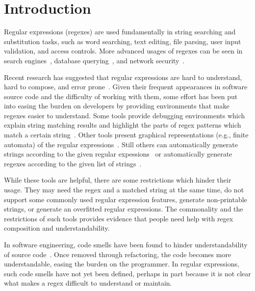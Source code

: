\section{Introduction }

Regular expressions (regexes) are used fundamentally in string searching and substitution tasks, such as word searching, text editing, file parsing, user input validation, and access controls. More advanced usages of regexes can be seen in search engines~\cite{zhao2005fully}, database querying~\cite{Yeole:2011:ADT:1980022.1980229}, and network security~\cite{network,hutchings2002assisting,ficara2008improved}.

Recent research has suggested that regular expressions are hard to understand, hard to compose, and error prone~\cite{Spishak:2012:TSR:2318202.2318207}. Given their frequent appearances in software source code and the difficulty of working with them, some effort has been put into easing the burden on developers by providing environments that make regexes easier to understand. Some tools provide debugging environments which explain string matching results and highlight the parts of regex patterns which match a certain string~\cite{regex101,regexr}. Other tools present graphical representations (e.g., finite automata) of the regular expressions~\cite{regexper,rise4fun}. Still others can automatically generate strings according to the given regular expessions~\cite{hampi,rex} or automatically generate regexes according to the given list of strings~\cite{Babbar:2010:CBA:1871840.1871848, Li:2008:REL:1613715.1613719}.

While these tools are helpful, there are some restrictions which hinder their usage. They may need the regex and a matched string at the same time, do not support some commonly used regular expression features, generate non-printable strings, or generate an overfitted regular expressions.
The commonality and the restrictions of such tools provides evidence that people need help with regex composition and understandability.

In software engineering, code smells have been found to hinder understandability of source code~\cite{abbes2011empirical, du2006does}.
Once removed through refactoring, the code becomes more understandable, easing the burden on the programmer.
In regular expressions, such code smells have not yet been defined, perhaps in part because it is not clear what makes a regex difficult to understand or maintain.

